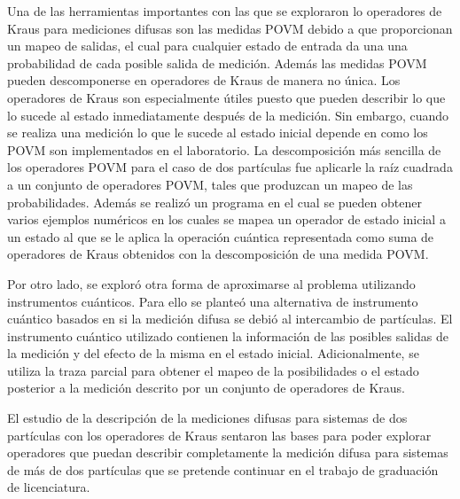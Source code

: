 

Una de las herramientas importantes con las que se exploraron lo operadores de Kraus para mediciones difusas son las medidas POVM debido a que proporcionan un mapeo de salidas, el cual para cualquier estado de entrada da una una probabilidad de cada posible salida de medición. Además las medidas POVM pueden descomponerse en operadores de Kraus de manera no única. Los operadores de Kraus son especialmente útiles puesto que pueden describir lo que lo sucede al estado inmediatamente después de la medición. Sin embargo, cuando se realiza una medición lo que le sucede al estado inicial depende en como los POVM son implementados en el laboratorio. La descomposición más sencilla de los operadores POVM para el caso de dos partículas fue aplicarle la raíz cuadrada a un conjunto de operadores POVM, tales que produzcan un mapeo de las probabilidades. Además se realizó un programa en el cual se pueden obtener varios ejemplos numéricos en los cuales se mapea un operador de estado inicial a un estado al que se le aplica la operación cuántica representada como suma de operadores de Kraus obtenidos con la descomposición de una medida POVM\@.

Por otro lado, se exploró otra forma de aproximarse al problema utilizando instrumentos cuánticos. Para ello se planteó una alternativa de instrumento cuántico basados en si la medición difusa se debió al intercambio de partículas. %
 El instrumento cuántico utilizado contienen la información de las posibles salidas de la medición  y del efecto de la misma en el estado inicial. Adicionalmente, se utiliza la traza parcial para obtener el mapeo de la posibilidades o el estado posterior a la medición descrito por un conjunto de operadores de Kraus.

El estudio de la descripción de la mediciones difusas para sistemas de dos partículas con los operadores de Kraus sentaron las bases para poder explorar operadores que puedan describir completamente la medición difusa para sistemas de más de dos partículas que se pretende continuar en el trabajo de graduación de licenciatura.
